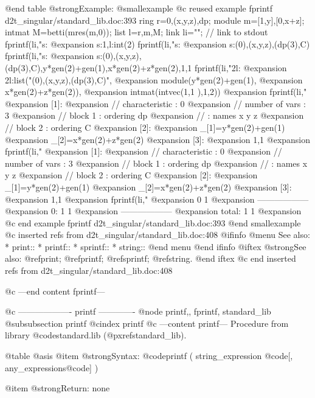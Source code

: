 {{@end table
@strong{Example:}
@smallexample
@c reused example fprintf d2t_singular/standard_lib.doc:393 
  ring r=0,(x,y,z),dp;
module m=[1,y],[0,x+z];
intmat M=betti(mres(m,0));
list l=r,m,M;
link li="";   // link to stdout
fprintf(li,"s:%
@expansion{} s:1,l:int(2)
fprintf(li,"s:%
@expansion{} s:(0),(x,y,z),(dp(3),C)
fprintf(li,"s:%
@expansion{} s:(0),(x,y,z),(dp(3),C),y*gen(2)+gen(1),x*gen(2)+z*gen(2),1,1 
fprintf(li,"2l:%
@expansion{} 2l:list("(0),(x,y,z),(dp(3),C)",
@expansion{} module(y*gen(2)+gen(1),
@expansion{} x*gen(2)+z*gen(2)),
@expansion{} intmat(intvec(1,1 ),1,2))
@expansion{} 
fprintf(li,"%
@expansion{} [1]:
@expansion{}    //   characteristic : 0
@expansion{} //   number of vars : 3
@expansion{} //        block   1 : ordering dp
@expansion{} //                  : names    x y z 
@expansion{} //        block   2 : ordering C
@expansion{} [2]:
@expansion{}    _[1]=y*gen(2)+gen(1)
@expansion{}    _[2]=x*gen(2)+z*gen(2)
@expansion{} [3]:
@expansion{}    1,1 
@expansion{} 
fprintf(li,"%
@expansion{} [1]:
@expansion{}    //   characteristic : 0
@expansion{} //   number of vars : 3
@expansion{} //        block   1 : ordering dp
@expansion{} //                  : names    x y z 
@expansion{} //        block   2 : ordering C
@expansion{} [2]:
@expansion{}    _[1]=y*gen(2)+gen(1)
@expansion{}    _[2]=x*gen(2)+z*gen(2)
@expansion{} [3]:
@expansion{}    1,1 
@expansion{} 
fprintf(li,"%
@expansion{}            0     1
@expansion{} ------------------
@expansion{}     0:     1     1
@expansion{} ------------------
@expansion{} total:     1     1
@expansion{} 
@c end example fprintf d2t_singular/standard_lib.doc:393
@end smallexample
@c inserted refs from d2t_singular/standard_lib.doc:408
@ifinfo
@menu
See also:
* print::
* printf::
* sprintf::
* string::
@end menu
@end ifinfo
@iftex
@strong{See also:}
@ref{print};
@ref{printf};
@ref{sprintf};
@ref{string}.
@end iftex
@c end inserted refs from d2t_singular/standard_lib.doc:408

@c ---end content fprintf---

@c ------------------- printf -------------
@node printf,, fprintf, standard_lib
@subsubsection printf
@cindex printf
@c ---content printf---
Procedure from library @code{standard.lib} (@pxref{standard_lib}).

@table @asis
@item @strong{Syntax:}
@code{printf (} string_expression @code{[,} any_expressions@code{] )}

@item @strong{Return:}
none

}}
